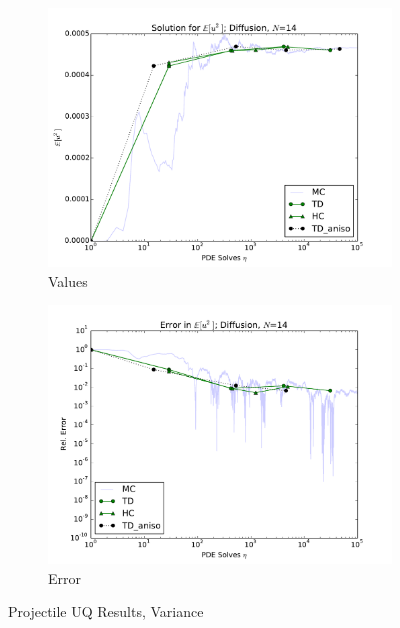 \documentclass[11pt]{article}
\begin{document}
\begin{figure}[H]
    \centering
    \begin{subfigure}[b]{0.49 \textwidth}
      \includegraphics[width=\textwidth]{../graphics/N14_aniso_var_vals}
      \caption{Values}
      \label{atn vals hdmr}
  \end{subfigure}
\begin{subfigure}[b]{0.49 \textwidth}
\centering
      \includegraphics[width=\textwidth]{../graphics/N14_aniso_var_errs}
      \caption{Error}
      \label{atn errs hdmr}
    \end{subfigure}
  \caption{Projectile UQ Results, Variance}
  \label{diff5 anis variance}
  \end{figure}
\end{document}
